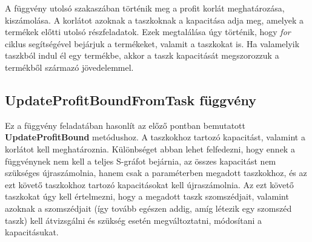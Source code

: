 A függvény utolsó szakaszában történik meg a profit korlát meghatározása, kiszámolása. A korlátot azoknak a taszkoknak a kapacitása adja meg, amelyek a termékek előtti utolsó részfeladatok. Ezek megtalálása úgy történik, hogy \textit{for} ciklus segítségével bejárjuk a termékeket, valamit a taszkokat is. Ha valamelyik taszkból indul él egy termékbe, akkor a taszk kapacitását megszorozzuk a termékből származó jövedelemmel.

\subsection{UpdateProfitBoundFromTask függvény}
Ez a függvény feladatában hasonlít az előző pontban bemutatott \textbf{UpdateProfitBound} metódushoz. A taszkokhoz tartozó kapacitást, valamint a korlátot kell meghatároznia. Különbséget abban lehet felfedezni, hogy ennek a függvénynek nem kell a teljes S-gráfot bejárnia, az összes kapacitást nem szükséges újraszámolnia, hanem csak a paraméterben megadott taszkokhoz, és az ezt követő taszkokhoz tartozó kapacitásokat kell újraszámolnia. Az ezt követő taszkokat úgy kell értelmezni, hogy a megadott taszk szomszédjait, valamint azoknak a szomszédjait (így tovább egészen addig, amíg létezik egy szomszéd taszk) kell átvizsgálni és szükség esetén megváltoztatni, módosítani a kapacitásukat.

